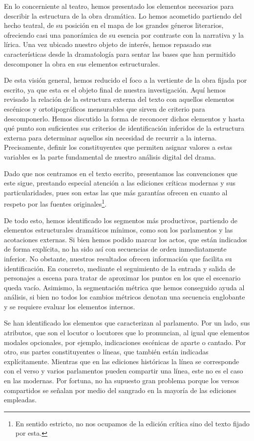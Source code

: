 En lo concerniente al teatro, hemos presentado los elementos necesarios para describir la estructura de la obra dramática. Lo hemos acometido partiendo del hecho teatral, de su posición  en el mapa de los grandes géneros literarios, ofreciendo casi una panorámica de su esencia por contraste con la narrativa y la lírica. Una vez ubicado nuestro objeto de interés, hemos repasado sus características desde la dramatología para sentar las bases que han permitido descomponer la obra en sus elementos estructurales.

De esta visión general, hemos reducido el foco a la vertiente de la obra fijada por escrito, ya que esta es el objeto final de nuestra investigación. Aquí hemos revisado la relación de la estructura externa del texto con aquellos elementos escénicos y ortotipográficos mensurables que sirven de criterio para descomponerlo. Hemos discutido la forma de reconocer dichos elementos y hasta qué punto son suficientes sus criterios de identificación inferidos de la estructura externa  para determinar aquellos sin necesidad de recurrir a la interna. Precisamente, definir los constituyentes que permiten asignar valores a estas variables es la parte fundamental de nuestro análisis digital del drama.

Dado que nos centramos en el texto escrito, presentamos las convenciones que este sigue, prestando especial atención a las ediciones críticas modernas y sus particularidades, pues son estas las que más garantías ofrecen en cuanto al respeto por las fuentes originales\footnote{En sentido estricto, no nos ocupamos de la edición crítica sino del texto fijado por esta.}.

De todo esto, hemos identificado los segmentos más productivos, partiendo de elementos estructurales dramáticos mínimos, como son los parlamentos y las acotaciones externas. Si bien hemos podido marcar los actos, que están indicados de forma explícita, no ha sido así con secuencias de orden inmediatamente inferior. No obstante, nuestros resultados ofrecen información que facilita su identificación. En concreto, mediante el seguimiento de la entrada y salida de personajes a escena para tratar de aproximar los puntos en los que el escenario queda vacío. Asimismo, la segmentación métrica que hemos conseguido ayuda al análisis, si bien no todos los cambios métricos denotan una secuencia englobante y se requiere evaluar los elementos internos.

Se han identificado los elementos que caracterizan al parlamento. Por un lado, sus atributos, que son el locutor o locutores que lo pronuncian, al igual que elementos modales opcionales, por ejemplo, indicaciones escénicas de aparte o cantado. Por otro, sus partes constituyentes o líneas, que también están indicadas explícitamente. Mientras que en las ediciones históricas la línea se corresponde con el verso y varios parlamentos pueden compartir una línea, este no es el caso en las modernas. Por fortuna, no ha supuesto gran problema porque los versos compartidos se señalan por medio del sangrado en la mayoría de las ediciones empleadas.

